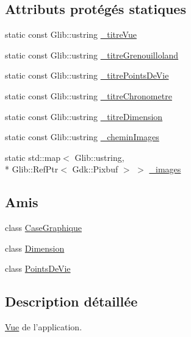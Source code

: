 \subsection*{Attributs protégés statiques}
\begin{DoxyCompactItemize}
\item 
static const Glib\-::ustring \hyperlink{classgrenouilloland_1_1Vue_a5adfea17feebe0674431b82d8215240e}{\-\_\-titre\-Vue}
\item 
static const Glib\-::ustring \hyperlink{classgrenouilloland_1_1Vue_a8f48d405d345306684f25471c377be4b}{\-\_\-titre\-Grenouilloland}
\item 
static const Glib\-::ustring \hyperlink{classgrenouilloland_1_1Vue_adc86530a0f01ba959d5dcd48a96f8b95}{\-\_\-titre\-Points\-De\-Vie}
\item 
static const Glib\-::ustring \hyperlink{classgrenouilloland_1_1Vue_af6206813ed4886372538752ddbaa746c}{\-\_\-titre\-Chronometre}
\item 
static const Glib\-::ustring \hyperlink{classgrenouilloland_1_1Vue_a233d73dd3c303194933f0da4d3749efe}{\-\_\-titre\-Dimension}
\item 
static const Glib\-::ustring \hyperlink{classgrenouilloland_1_1Vue_a2129d9ff7713d6b8d8c2cd444c6c7344}{\-\_\-chemin\-Images}
\item 
static std\-::map$<$ Glib\-::ustring, \\*
Glib\-::\-Ref\-Ptr$<$ Gdk\-::\-Pixbuf $>$ $>$ \hyperlink{classgrenouilloland_1_1Vue_a1ad2483d0795c038267934208730d415}{\-\_\-images}
\end{DoxyCompactItemize}
\subsection*{Amis}
\begin{DoxyCompactItemize}
\item 
class \hyperlink{classgrenouilloland_1_1Vue_ac12b0ba9ebe667c8408ac35bf21598e8}{Case\-Graphique}
\item 
class \hyperlink{classgrenouilloland_1_1Vue_aabae1fdc220bf040d4f5c2c057abfcf5}{Dimension}
\item 
class \hyperlink{classgrenouilloland_1_1Vue_a2f6a9fb1ac6fc3eaae981e0630df21d8}{Points\-De\-Vie}
\end{DoxyCompactItemize}


\subsection{Description détaillée}
\hyperlink{classgrenouilloland_1_1Vue}{Vue} de l'application. 

